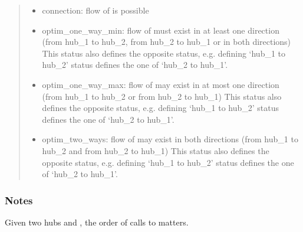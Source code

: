 \documentclass[letterpaper,10pt,english]{sphinxmanual}
\begin{document}
\begin{fulllineitems}
\begin{fulllineitems}
\begin{quote}
\begin{description}
\begin{itemize}
\begin{itemize}
\item {} 
\sphinxAtStartPar
connection: flow of  is possible

\item {} 
\sphinxAtStartPar
optim\_one\_way\_min: flow of  must exist in at least one direction
(from hub\_1 to hub\_2, from hub\_2 to hub\_1 or in both directions)
This status also defines the opposite status, e.g. defining ‘hub\_1 to hub\_2’ status defines the one of ‘hub\_2 to hub\_1’.

\item {} 
\sphinxAtStartPar
optim\_one\_way\_max: flow of  may exist in at most one direction
(from hub\_1 to hub\_2 or from hub\_2 to hub\_1)
This status also defines the opposite status, e.g. defining ‘hub\_1 to hub\_2’ status defines the one of ‘hub\_2 to hub\_1’.

\item {} 
\sphinxAtStartPar
optim\_two\_ways: flow of  may exist in both directions
(from hub\_1 to hub\_2 and from hub\_2 to hub\_1)
This status also defines the opposite status, e.g. defining ‘hub\_1 to hub\_2’ status defines the one of ‘hub\_2 to hub\_1’.

\end{itemize}


\end{itemize}

\end{description}\end{quote}
\subsubsection*{Notes}

\sphinxAtStartPar
Given two hubs  and , the order of calls to  matters.

\begin{sphinxVerbatim}[commandchars=\\\{\}]
  
  
    
\end{sphinxVerbatim}


\end{fulllineitems}
\end{fulllineitems}
\end{document}
